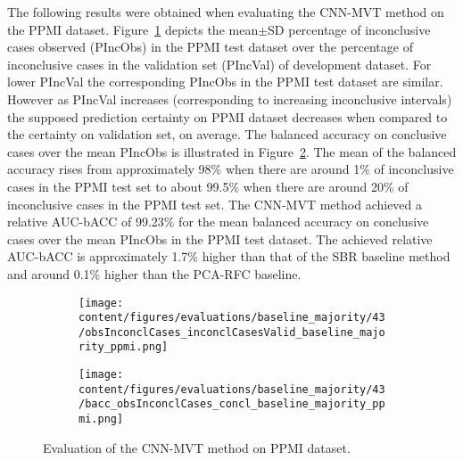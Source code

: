 The following results were obtained when evaluating the CNN-MVT method on the PPMI dataset.
Figure~\ref{fig:obsInconclCases_inconclCasesValid_baseline_majority_ppmi} depicts the
mean$\pm$SD percentage of inconclusive cases observed (PIncObs) in the PPMI test dataset 
over the percentage of inconclusive cases in the validation set (PIncVal) of development dataset.
For lower PIncVal the corresponding PIncObs in the PPMI test dataset are similar.
However as PIncVal increases (corresponding to increasing inconclusive intervals) 
the supposed prediction certainty on PPMI dataset decreases when compared to the certainty on validation set, on average.
The balanced accuracy on conclusive cases over the mean PIncObs is illustrated 
in Figure~\ref{fig:bacc_obsInconclCases_concl_baseline_majority_ppmi}.
The mean of the balanced accuracy rises from approximately 98\% 
when there are around 1\% of inconclusive cases in the PPMI test set to about 99.5\% 
when there are around 20\% of inconclusive cases in the PPMI test set.
The CNN-MVT method achieved a relative AUC-bACC of 99.23\% for the mean balanced accuracy on conclusive cases 
over the mean PIncObs in the PPMI test dataset.
The achieved relative AUC-bACC is approximately 1.7\% higher than that of the SBR baseline method 
and around 0.1\% higher than the PCA-RFC baseline.

\begin{figure}[ht]
  \begin{subfigure}{0.49\textwidth}
    \centering
    \texttt{[image: content/figures/evaluations/baseline\_majority/43/obsInconclCases\_inconclCasesValid\_baseline\_majority\_ppmi.png]}
    \label{fig:obsInconclCases_inconclCasesValid_baseline_majority_ppmi}
  \end{subfigure}
  \hfill
  \begin{subfigure}{0.49\textwidth}
    \centering
    \texttt{[image: content/figures/evaluations/baseline\_majority/43/bacc\_obsInconclCases\_concl\_baseline\_majority\_ppmi.png]}
    \label{fig:bacc_obsInconclCases_concl_baseline_majority_ppmi}
  \end{subfigure}
  \caption{Evaluation of the CNN-MVT method on PPMI dataset.}
  \label{fig:perf_results_mvt_ppmi}
\end{figure}


